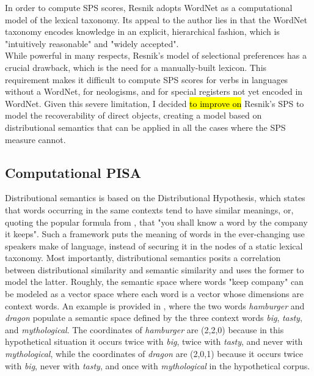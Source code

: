 In order to compute SPS scores, Resnik adopts WordNet \parencite{beckwith1991wordnet,Miller1995} as a computational model of the lexical taxonomy. Its appeal to the author \parencite[32]{Resnik1993} lies in that the WordNet taxonomy encodes knowledge in an explicit, hierarchical fashion, which is "intuitively reasonable" and "widely accepted".\\ While powerful in many respects, Resnik's model of selectional preferences has a crucial drawback, which is the need for a manually-built lexicon. This requirement makes it difficult to compute SPS scores for verbs in languages without a WordNet, for neologisms, and for special registers not yet encoded in WordNet. Given this severe limitation, I decided \hl{to improve on} Resnik's SPS to model the recoverability of direct objects, creating a model based on distributional semantics \parencite{Lenci:2018} that can be applied in all the cases where the SPS measure cannot.

\subsection{Computational PISA}

Distributional semantics is based on the Distributional Hypothesis, which states that words occurring in the same contexts tend to have similar meanings, or, quoting the popular formula from \textcite{firth1957synopsis}, that "you shall know a word by the company it keeps". Such a framework puts the meaning of words in the ever-changing use speakers make of language, instead of securing it in the nodes of a static lexical taxonomy. Most importantly, distributional semantics posits a correlation between distributional similarity and semantic similarity and uses the former to model the latter. Roughly, the semantic space where words "keep company" can be modeled as a vector space where each word is a vector whose dimensions are context words. An example is provided in , where the two words \textit{hamburger} and \textit{dragon} populate a semantic space defined by the three context words \textit{big}, \textit{tasty}, and \textit{mythological}. The coordinates of \textit{hamburger} are (2,2,0) because in this hypothetical situation it occurs twice with \textit{big}, twice with \textit{tasty}, and never with \textit{mythological}, while the coordinates of \textit{dragon} are (2,0,1) because it occurs twice with \textit{big}, never with \textit{tasty}, and once with \textit{mythological} in the hypothetical corpus.

